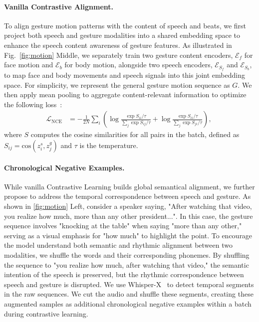 \vspace{-0.2cm}
\paragraph{Vanilla Contrastive Alignment.} 
To align gesture motion patterns with the content of speech and beats, we first project both speech and gesture modalities into a shared embedding space to enhance the speech content awareness of gesture features. As illustrated in Fig.~\ref{fig:motion} Middle, we separately train two gesture content encoders, \(\mathcal{E}_f\) for face motion and \(\mathcal{E}_b\) for body motion, alongside two speech encoders, \(\mathcal{E}_{S_f}\) and \(\mathcal{E}_{S_b}\), to map face and body movements and speech signals into this joint embedding space. For simplicity, we represent the general gesture motion sequence as \( G \). We then apply mean pooling to aggregate content-relevant information to optimize the following loss~\cite{infonce}:
{\small
\begin{equation}
\begin{split} 
    \mathcal{L}_{\text{NCE}} &= - \frac{1}{2N} \sum_{i} \left( \log \frac{\exp{S_{ii}/\tau}}{\sum_{j} \exp{S_{ij}/\tau}} + \log \frac{\exp{S_{ii}/\tau}}{\sum_{j} \exp{S_{ji}/\tau}} \right), ~
\end{split}
\label{eq:infonce}
\end{equation}
}
where \( S \) computes the cosine similarities for all pairs in the batch, defined as \( S_{ij} = \text{cos}(z^s_i, z^g_j) \) and \(\tau\) is the temperature.

\vspace{-0.2cm}
\paragraph{Chronological Negative Examples.} While vanilla Contrastive Learning builds global semantical alignment, we further propose to address the temporal correspondence between speech and gesture. As shown in \cref{fig:motion} Left, consider a speaker saying, "After watching that video, you realize how much, more than any other president...". In this case, the gesture sequence involves "knocking at the table" when saying "more than any other," serving as a visual emphasis for "how much" to highlight the point. To encourage the model understand both semantic and rhythmic alignment between two modalities, we shuffle the words and their corresponding phonemes. By shuffling the sequence to "you realize how much, after watching that video," the semantic intention of the speech is preserved, but the rhythmic correspondence between speech and gesture is disrupted. We use Whisper-X~\cite{bain2022whisperx} to detect temporal segments in the raw sequences. We cut the audio and shuffle these segments, creating these augmented samples as additional chronological negative examples within a batch during contrastive learning.  

